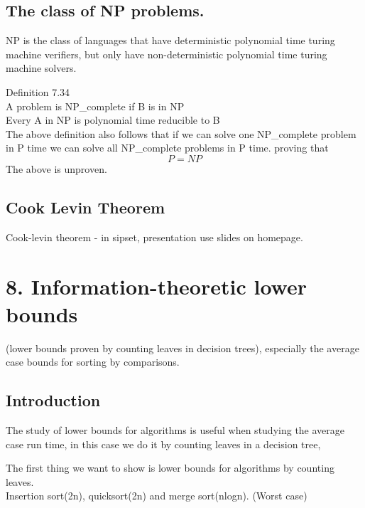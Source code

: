 \documentclass[a4paper,10pt,titlepage]{report}
\begin{document}
\subsection{The class of NP problems.}
NP is the class of languages that have deterministic polynomial time turing machine verifiers, but only have non-deterministic polynomial time turing machine solvers.

Definition 7.34\\
A problem is NP\_complete if B is in NP\\
Every A in NP is polynomial time reducible to B\\

The above definition also follows that if we can solve one NP\_complete problem in P time we can solve all NP\_complete problems in P time. proving that\\
\begin{equation}
P = NP
\end{equation}
The above is unproven. \\

\subsection{Cook Levin Theorem}

Cook-levin theorem - in sipset, presentation use slides on homepage.


\newpage
\section{8. Information-theoretic lower bounds}

(lower bounds proven by counting leaves in decision trees), especially the average case bounds for sorting
by comparisons.

\subsection{Introduction}

The study of lower bounds for algorithms is useful when studying the average case run time, in this case we do it by counting leaves in a decision tree,

The first thing we want to show is lower bounds for algorithms by counting leaves.\\

Insertion sort(2n), quicksort(2n) and merge sort(nlogn). (Worst case)\\
\end{document}
